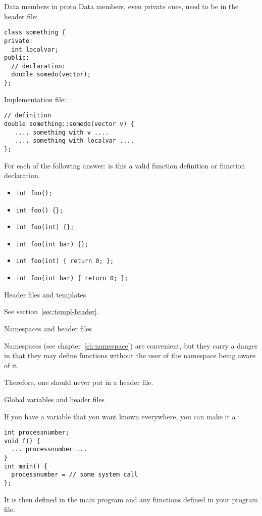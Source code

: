 \begin{block}{Data members in proto}
  \label{sl:class-proto-private}
  Data members, even private ones, need to be in the header file:
  \lstset{style=snippetcode}
\begin{lstlisting}
class something {
private:
  int localvar;
public:
  // declaration:
  double somedo(vector);
};
\end{lstlisting}
Implementation file:
\begin{lstlisting}
// definition
double something::somedo(vector v) {
   .... something with v ....
   .... something with localvar ....
};
\end{lstlisting}
\end{block}

\begin{review}
  \label{rev:proto-c-cpp}
  For each of the following answer: is this a valid function
  definition or function declaration.
  \begin{itemize}
  \item \verb+int foo();+
  \item \verb+int foo() {};+
  \item \verb+int foo(int) {};+
  \item \verb+int foo(int bar) {};+
  \item \verb+int foo(int) { return 0; };+
  \item \verb+int foo(int bar) { return 0; };+
  \end{itemize}
\end{review}

 {Header files and templates}

See section~\ref{sec:templ-header}.

 {Namespaces and header files}
\label{sec:namespace-header}

Namespaces
(see chapter~\ref{ch:namespace})
are convenient, but they carry a danger in that they may define
functions without the user of the namespace being aware of it.

Therefore, one should never put  in a header
file.

 {Global variables and header files}
\label{ex:globalvar}

If you have a variable that you want known everywhere, you can make it
a :
\begin{lstlisting}
int processnumber;
void f() {
  ... processnumber ...
}
int main() {
  processnumber = // some system call
};
\end{lstlisting}
It is then defined in the main program and any functions defined in your program file.


